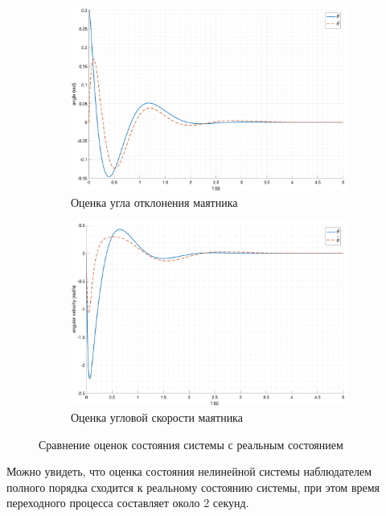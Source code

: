 \begin{figure}[ht!]
\begin{subfigure}[b]{0.45\textwidth}
        \includegraphics[width=\textwidth]{media/plots/modal_observer/observer_theta_cmp_1.png}
        \caption{Оценка угла отклонения маятника}
        \label{fig:observer_theta_cmp_1}
    \end{subfigure}
    \begin{subfigure}[b]{0.45\textwidth}
        \includegraphics[width=\textwidth]{media/plots/modal_observer/observer_dottheta_cmp_1.png}
        \caption{Оценка угловой скорости маятника}
        \label{fig:observer_dottheta_cmp_1}
    \end{subfigure}
    \caption{Сравнение оценок состояния системы с реальным состоянием}
    \label{fig:observer_x_cmp_1_sep}
\end{figure}
\FloatBarrier
Можно увидеть, что оценка состояния нелинейной системы наблюдателем полного порядка
сходится к реальному состоянию системы, при этом время переходного процесса составляет около 2 секунд.

